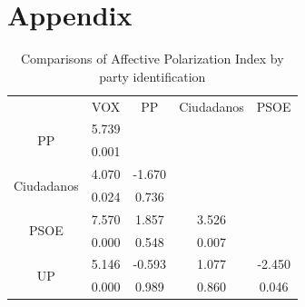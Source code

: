 \documentclass[a4paper, svgnames]{article}
\begin{document}

\newpage




\newpage

\section*{Appendix}

\begin{table}[H]
	\centering
	\caption{Comparisons of Affective Polarization Index by party identification}
	\label{tab:anova-parties}
	\begin{tabular}{@{}ccccc@{}}
		\toprule
		\multirow{2}{*}{}           & \multirow{2}{*}{VOX} & \multirow{2}{*}{PP} & \multirow{2}{*}{Ciudadanos} & \multirow{2}{*}{PSOE} \\
		                            &                      &                     &                             &                       \\ \midrule
		\multirow{2}{*}{PP}         & 5.739                &                     &                             &                       \\
		                            & 0.001                &                     &                             &                       \\
		\multirow{2}{*}{Ciudadanos} & 4.070                & -1.670              &                             &                       \\
		                            & 0.024                & 0.736               &                             &                       \\
		\multirow{2}{*}{PSOE}       & 7.570                & 1.857               & 3.526                       &                       \\
		                            & 0.000                & 0.548               & 0.007                       &                       \\
		\multirow{2}{*}{UP}         & 5.146                & -0.593              & 1.077                       & -2.450                \\
		                            & 0.000                & 0.989               & 0.860                       & 0.046                 \\ \bottomrule
	\end{tabular}
\end{table}
\end{document}
